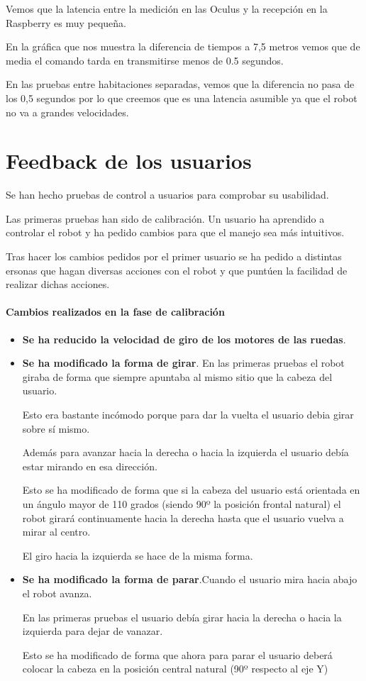 \documentclass[twoside, 12pt]{epstfg}
\begin{document}
Vemos que la latencia entre la medición en las Oculus y la recepción en la Raspberry es muy pequeña.

En la gráfica que nos muestra la diferencia de tiempos a 7,5 metros vemos que de media el comando tarda en transmitirse menos de 0.5 segundos.

En las pruebas entre habitaciones separadas, vemos que la diferencia no pasa de los 0,5 segundos por lo que creemos que es una latencia asumible ya que el robot no va a grandes velocidades.
\newpage

\section{Feedback de los usuarios}

Se han hecho pruebas de control a usuarios para comprobar su usabilidad.

Las primeras pruebas han sido de calibración. Un usuario ha aprendido a controlar el robot y ha pedido cambios para que el manejo sea más intuitivos.

Tras hacer los cambios pedidos por el primer usuario se ha pedido a distintas ersonas que hagan diversas acciones con el robot y que puntúen la facilidad de realizar dichas acciones.

\paragraph{Cambios realizados en la fase de calibración}
\begin{itemize}
	\item \textbf{Se ha reducido la velocidad de giro de los motores de las ruedas}.
	
	\item \textbf{Se ha modificado la forma de girar}. En las primeras pruebas el robot giraba de forma que siempre apuntaba al mismo sitio que la cabeza del usuario.
	
	Esto era bastante incómodo porque para dar la vuelta el usuario debia girar sobre sí mismo.
	
	Además para avanzar hacia la derecha o hacia la izquierda el usuario debía estar mirando en esa dirección.
	
	Esto se ha modificado de forma que si la cabeza del usuario está orientada en un ángulo mayor de 110 grados (siendo 90º la posición frontal natural) el robot girará continuamente hacia la derecha hasta que el usuario vuelva a mirar al centro.
	
	El giro hacia la izquierda se hace de la misma forma.
	
	\item \textbf{Se ha modificado la forma de parar}.Cuando el usuario mira hacia abajo el robot avanza.
	
	En las primeras pruebas el usuario debía girar hacia la derecha o hacia la izquierda para dejar de vanazar.
	
	Esto se ha modificado de forma que ahora para parar el usuario deberá colocar la cabeza en la posición central natural (90º respecto al eje Y)
\end{itemize}
\end{document}
